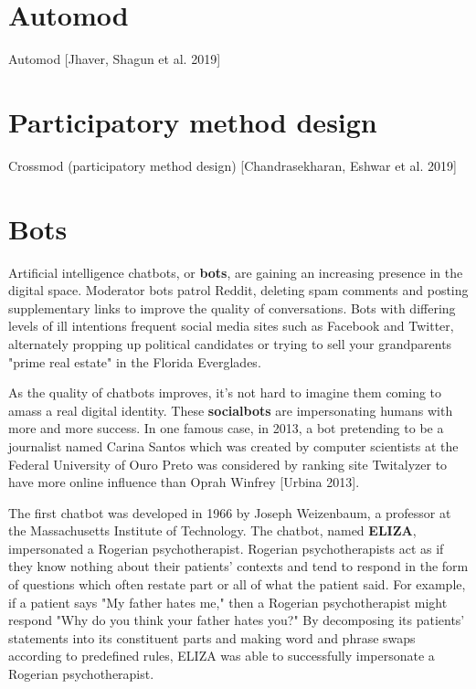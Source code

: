 \documentclass[class=book, crop=false]{standalone}
\providecommand{\keyterm}[1]{\textbf{#1}\marginnote{\scriptsize \textbf{#1}}}
\begin{document}
\section{Automod}

Automod [Jhaver, Shagun et al. 2019]

\section{Participatory method design}

Crossmod (participatory method design) [Chandrasekharan, Eshwar et al. 2019]

\section{Bots}

Artificial intelligence chatbots, or \keyterm{bots}, are gaining an increasing presence in the digital space. Moderator bots patrol Reddit, deleting spam comments and posting supplementary links to improve the quality of conversations. Bots with differing levels of ill intentions frequent social media sites such as Facebook and Twitter, alternately propping up political candidates or trying to sell your grandparents "prime real estate" in the Florida Everglades.

As the quality of chatbots improves, it's not hard to imagine them coming to amass a real digital identity. These \keyterm{socialbots} are impersonating humans with more and more success. In one famous case, in 2013, a bot pretending to be a journalist named Carina Santos which was created by computer scientists at the Federal University of Ouro Preto was considered by ranking site Twitalyzer to have more online influence than Oprah Winfrey [Urbina 2013].

The first chatbot was developed in 1966 by Joseph Weizenbaum, a professor at the Massachusetts Institute of Technology. The chatbot, named \keyterm{ELIZA}, impersonated a Rogerian psychotherapist. Rogerian psychotherapists act as if they know nothing about their patients' contexts and tend to respond in the form of questions which often restate part or all of what the patient said. For example, if a patient says "My father hates me," then a Rogerian psychotherapist might respond "Why do you think your father hates you?" By decomposing its patients' statements into its constituent parts and making word and phrase swaps according to predefined rules, ELIZA was able to successfully impersonate a Rogerian psychotherapist.
\end{document}
